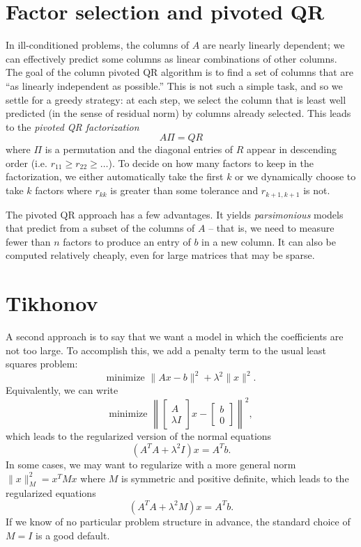 \documentclass[12pt, leqno]{article}
\begin{document}
\section{Factor selection and pivoted QR}

In ill-conditioned problems, the columns of $A$ are nearly linearly
dependent; we can effectively predict some columns as linear
combinations of other columns.  The goal of the column pivoted QR
algorithm is to find a set of columns that are ``as linearly
independent as possible.''  This is not such a simple task,
and so we settle for a greedy strategy: at each step, we select the
column that is least well predicted (in the sense of residual norm)
by columns already selected.  This leads to the {\em pivoted QR
  factorization}
\[
  A \Pi = Q R
\]
where $\Pi$ is a permutation and the diagonal entries of $R$ appear
in descending order (i.e. $r_{11} \geq r_{22} \geq \ldots$).  To
decide on how many factors to keep in the factorization, we either
automatically take the first $k$ or we dynamically choose to take $k$
factors where $r_{kk}$ is greater than some tolerance and
$r_{k+1,k+1}$ is not.

The pivoted QR approach has a few advantages.  It yields {\em
  parsimonious} models that predict from a subset of the columns of
$A$ -- that is, we need to measure fewer than $n$ factors to produce
an entry of $b$ in a new column.  It can also be computed relatively
cheaply, even for large matrices that may be sparse.

\section{Tikhonov}

A second approach is to say that we want a model in which the
coefficients are not too large.  To accomplish this, we add
a penalty term to the usual least squares problem:
\[
  \mbox{minimize } \|Ax-b\|^2 + \lambda^2 \|x\|^2.
\]
Equivalently, we can write
\[
\mbox{minimize } \left\|
\begin{bmatrix} A \\ \lambda I \end{bmatrix} x -
\begin{bmatrix} b \\ 0 \end{bmatrix}
\right\|^2,
\]
which leads to the regularized version of the normal equations
\[
  (A^T A + \lambda^2 I) x = A^T b.
\]
In some cases, we may want to regularize with a more general
norm $\|x\|_M^2 = x^T M x$ where $M$ is symmetric and positive
definite, which leads to the regularized equations
\[
  (A^T A + \lambda^2 M) x = A^T b.
\]
If we know of no particular problem structure in advance, the
standard choice of $M = I$ is a good default.
\end{document}
